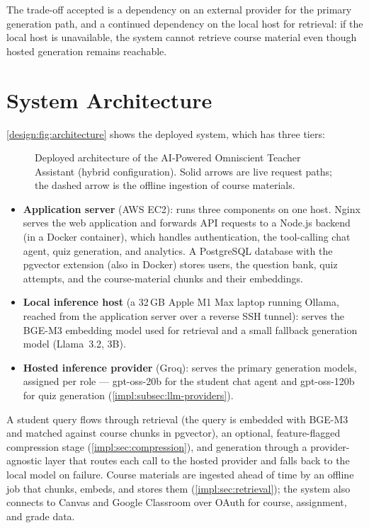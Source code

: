 The trade-off accepted is a dependency on an external provider for the
primary generation path, and a continued dependency on the local host for
retrieval: if the local host is unavailable, the system cannot retrieve
course material even though hosted generation remains reachable.

\section{System Architecture}
\label{design:sec:architecture}

\autoref{design:fig:architecture} shows the deployed system, which has three
tiers:

\begin{figure}[htb]
  \centering
  
  \caption{Deployed architecture of the AI-Powered Omniscient Teacher
           Assistant (hybrid configuration). Solid arrows are live request
           paths; the dashed arrow is the offline ingestion of course
           materials.}
  \label{design:fig:architecture}
\end{figure}

\begin{itemize}
  \item \textbf{Application server} (AWS EC2): runs three components on
        one host. Nginx serves the web application and forwards API
        requests to a Node.js backend (in a Docker container), which handles
        authentication, the tool-calling chat agent, quiz generation, and
        analytics. A PostgreSQL database with the pgvector extension (also
        in Docker) stores users, the question bank, quiz attempts, and the
        course-material chunks and their embeddings.
  \item \textbf{Local inference host} (a 32\,GB Apple M1 Max laptop running
        Ollama, reached from the application server over a reverse SSH
        tunnel): serves the BGE-M3 embedding model used for retrieval and a
        small fallback generation model (Llama~3.2, 3B).
  \item \textbf{Hosted inference provider} (Groq): serves the primary
        generation models, assigned per role --- gpt-oss-20b for the student
        chat agent and gpt-oss-120b for quiz generation
        (\autoref{impl:subsec:llm-providers}).
\end{itemize}

A student query flows through retrieval (the query is embedded with BGE-M3
and matched against course chunks in pgvector), an optional, feature-flagged
compression stage (\autoref{impl:sec:compression}), and generation through a
provider-agnostic layer that routes each call to the hosted provider and
falls back to the local model on failure. Course materials are ingested
ahead of time by an offline job that chunks, embeds, and stores them
(\autoref{impl:sec:retrieval}); the system also connects to Canvas and
Google Classroom over OAuth for course, assignment, and grade data.

